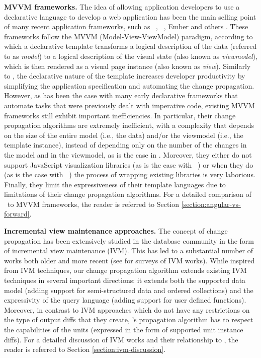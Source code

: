 {\bf MVVM frameworks.} The idea of allowing application developers to use a declarative language to develop a web application has been the main selling point of many recent application frameworks, such as \angular\ \cite{angularjs}, \react\ \cite{react}, Ember \cite{ember} and others \cite{knockout, catel, mvvmcross, mvvmlight}.  These frameworks follow the MVVM (Model-View-ViewModel) paradigm, according to which a declarative template transforms a logical description of the data (referred to as \emph{model}) to a logical description of the visual state (also known as \emph{viewmodel}), which is then rendered as a visual page instance (also known as \emph{view}). Similarly to \projname, the declarative nature of the template increases developer productivity by simplifying the application specification  and automating the change propagation. However, as has been the case with many early declarative frameworks that automate tasks that were previously dealt with imperative code, existing MVVM frameworks still exhibit important inefficiencies. In particular, their change propagation algorithms are extremely inefficient, with a complexity that depends on the size of the entire model (i.e., the data) and/or the viewmodel (i.e., the template instance), instead of depending only on the number of the changes in the model and in the viewmodel, as is the case in \projname. Moreover, they either do not support JavaScript visualization libraries (as is the case with \react\ \cite{react}) or when they do (as is the case with \angular\ \cite{angularjs}) the process of wrapping existing libraries is very laborious. Finally, they limit the expressiveness of their template languages due to limitations of their change propagation algorithms. For a detailed comparison of \projname\ to MVVM frameworks, the reader is referred to Section \ref{section:angular-vs-forward}.

{\bf Incremental view maintenance approaches.} The concept of change propagation has been extensively studied in the database community in the form of incremental view maintenance (IVM). This has led to a substantial number of works both older  \cite{vm-blt-86, vm-bcl-89, vm-91, vm-qw-91, view-sigmod-93} and more recent \cite{dbtoaster-vldbj-2014, idivm-sigmod-2015} (see \cite{survey-deb-95,mv-survey-12} for surveys of IVM works). While inspired from IVM techniques, our change propagation algorithm extends existing IVM techniques in several important directions: it extends both the supported data model (adding support for semi-structured data and ordered collections) and the expressivity of the query language (adding support for user defined functions). Moreover, in contrast to IVM approaches which do not have any restrictions on the type of output diffs that they create, \projname's propagation algorithm has to respect the capabilities of the units (expressed in the form of supported unit instance diffs). For a detailed discussion of IVM works and their relationship to \projname, the reader is referred to Section \ref{section:ivm-discussion}.

